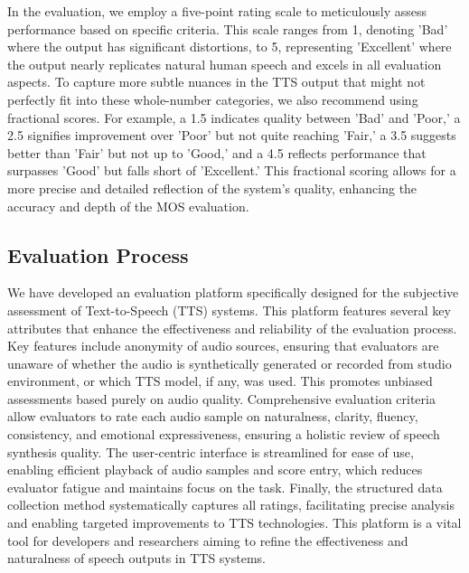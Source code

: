 In the evaluation, we employ a five-point rating scale to meticulously assess performance based on specific criteria. This scale ranges from 1, denoting 'Bad' where the output has significant distortions, to 5, representing 'Excellent' where the output nearly replicates natural human speech and excels in all evaluation aspects. To capture more subtle nuances in the TTS output that might not perfectly fit into these whole-number categories, we also recommend using fractional scores. For example, a 1.5 indicates quality between 'Bad' and 'Poor,' a 2.5 signifies improvement over 'Poor' but not quite reaching 'Fair,' a 3.5 suggests better than 'Fair' but not up to 'Good,' and a 4.5 reflects performance that surpasses 'Good' but falls short of 'Excellent.' This fractional scoring allows for a more precise and detailed reflection of the system's quality, enhancing the accuracy and depth of the MOS evaluation.

\subsection{Evaluation Process}
We have developed an evaluation platform specifically designed for the subjective assessment of Text-to-Speech (TTS) systems. This platform features several key attributes that enhance the effectiveness and reliability of the evaluation process. Key features include anonymity of audio sources, ensuring that evaluators are unaware of whether the audio is synthetically generated or recorded from studio environment, or which TTS model, if any, was used. This promotes unbiased assessments based purely on audio quality. Comprehensive evaluation criteria allow evaluators to rate each audio sample on naturalness, clarity, fluency, consistency, and emotional expressiveness, ensuring a holistic review of speech synthesis quality. The user-centric interface is streamlined for ease of use, enabling efficient playback of audio samples and score entry, which reduces evaluator fatigue and maintains focus on the task. Finally, the structured data collection method systematically captures all ratings, facilitating precise analysis and enabling targeted improvements to TTS technologies. This platform is a vital tool for developers and researchers aiming to refine the effectiveness and naturalness of speech outputs in TTS systems.

